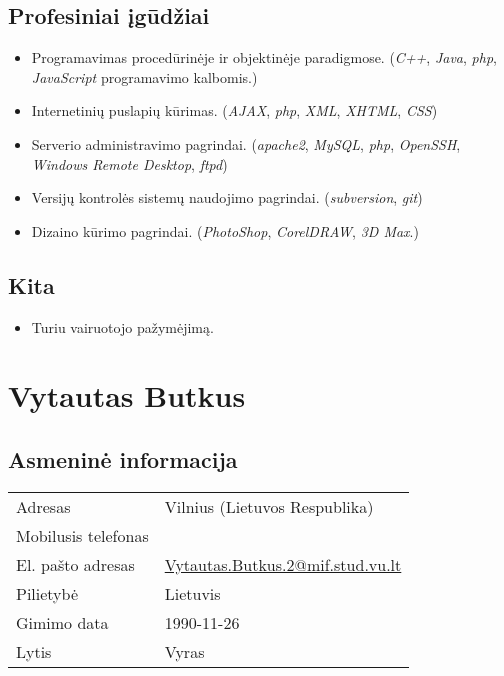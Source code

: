 \subsection{Profesiniai įgūdžiai}

\begin{itemize}
  \item Programavimas procedūrinėje ir objektinėje paradigmose. 
    (\emph{C++}, \emph{Java}, \emph{php}, \emph{JavaScript} 
    programavimo kalbomis.)
  \item Internetinių puslapių kūrimas. (\emph{AJAX}, \emph{php}, 
    \emph{XML}, \emph{XHTML}, \emph{CSS})
  \item Serverio administravimo pagrindai. 
    (\emph{apache2}, \emph{MySQL}, \emph{php}, \emph{OpenSSH}, 
    \emph{Windows Remote Desktop}, \emph{ftpd})
  \item Versijų kontrolės sistemų naudojimo pagrindai. 
    (\emph{subversion}, \emph{git})
  \item Dizaino kūrimo pagrindai. (\emph{PhotoShop}, \emph{CorelDRAW},
    \emph{3D Max}.)
\end{itemize}

\subsection{Kita}

\begin{itemize}
  \item Turiu vairuotojo pažymėjimą.
\end{itemize}

\section{Vytautas Butkus}

\subsection{Asmeninė informacija}

\begin{tabular}[]{p{3cm} | p{8cm}}
  Adresas & Vilnius (Lietuvos Respublika) \\
  Mobilusis telefonas & \\
  El. pašto adresas & \url{Vytautas.Butkus.2@mif.stud.vu.lt} \\
  Pilietybė & Lietuvis \\
  Gimimo data & 1990-11-26\\
  Lytis & Vyras \\
\end{tabular}

